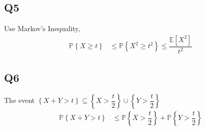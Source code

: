\documentclass{article}
\begin{document}
\subsection{Q5}
Use Markov's Inequality,
\begin{align*}
\mathbb{P}\left\{X \geq  t\right\} &\leq  \mathbb{P}\left\{X^{2} \geq  t^{2}\right\} \leq  \dfrac{\mathbb{E}\left[X^{2}\right]}{t^{2}}
\end{align*}


\subsection{Q6}
The event $\left\{X  + Y  > t \right\} \subseteq \left\{X  > \dfrac{t}{2}\right\} \cup \left\{Y  > \dfrac{t}{2}\right\}$
\begin{align*}
\mathbb{P}\left\{X + Y > t\right\} &\leq  \mathbb{P}\left\{X > \dfrac{t}{2}\right\} + \mathbb{P}\left\{Y > \dfrac{t}{2}\right\}
\end{align*}
\end{document}
